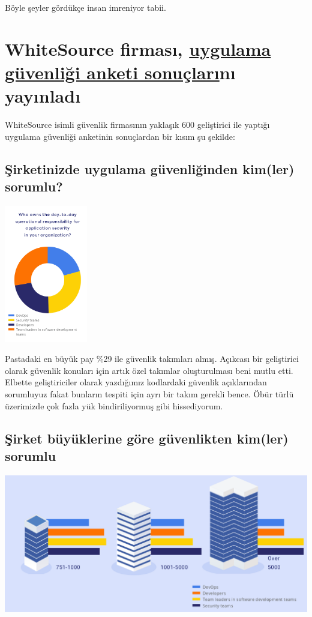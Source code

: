 \documentclass[11pt]{article}
\begin{document}
Böyle şeyler gördükçe insan imreniyor tabii.
\section{WhiteSource firması, \href{https://www.whitesourcesoftware.com/developers-security-report/}{uygulama güvenliği anketi sonuçları}nı yayınladı}
\label{sec:orgbea8762}
WhiteSource isimli güvenlik firmasının yaklaşık 600 geliştirici ile yaptığı
uygulama güvenliği anketinin sonuçlardan bir kısım şu şekilde:
\subsection{Şirketinizde uygulama güvenliğinden kim(ler) sorumlu?}
\label{sec:orgfe3e1f0}
\begin{center}
\includegraphics[height=6cm]{gorseller/anket-1.png}
\end{center}

Pastadaki en büyük pay \%29 ile güvenlik takımları almış. Açıkcası bir
geliştirici olarak güvenlik konuları için artık özel takımlar oluşturulması
beni mutlu etti. Elbette geliştiriciler olarak yazdığımız kodlardaki güvenlik
açıklarından sorumluyuz fakat bunların tespiti için ayrı bir takım gerekli
bence. Öbür türlü üzerimizde çok fazla yük bindiriliyormuş gibi hissediyorum.
\subsection{Şirket büyüklerine göre güvenlikten kim(ler) sorumlu}
\label{sec:org8215bd9}
\begin{center}
\includegraphics[width=.9\linewidth]{gorseller/anket-2.png}
\end{center}
\end{document}
